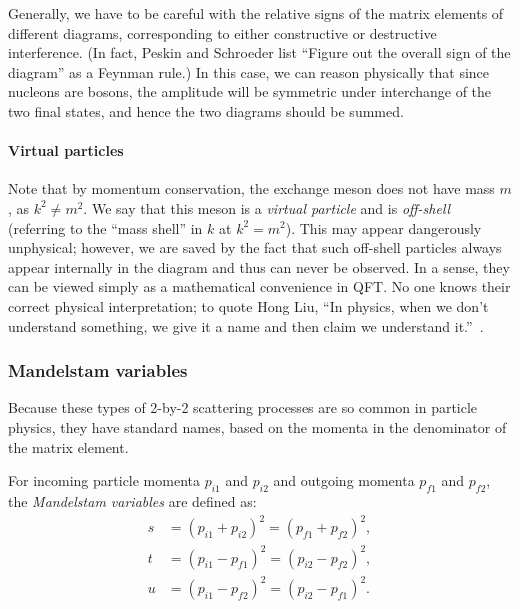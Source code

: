 Generally, we have to be careful with the relative signs of the matrix elements of different diagrams, corresponding to either constructive or destructive interference.
(In fact, Peskin and Schroeder list ``Figure out the overall sign of the diagram'' as a Feynman rule.)
In this case, we can reason physically that since nucleons are bosons, the amplitude will be symmetric under interchange of the two final states, and hence the two diagrams should be summed.

\paragraph{Virtual particles}

Note that by momentum conservation, the exchange meson does not have mass $m$, as $k^2 \neq m^2$.
We say that this meson is a \textit{virtual particle} and is \textit{off-shell} (referring to the ``mass shell'' in $k$ at $k^2 = m^2$).
This may appear dangerously unphysical; however, we are saved by the fact that such off-shell particles always appear internally in the diagram and thus can never be observed.
In a sense, they can be viewed simply as a mathematical convenience in QFT.
No one knows their correct physical interpretation; to quote Hong Liu, ``In physics, when we don't understand something, we give it a name and then claim we understand it.''~\cite{LiuRQFT}.


\subsubsection{Mandelstam variables}

Because these types of 2-by-2 scattering processes are so common in particle physics, they have standard names, based on the momenta in the denominator of the matrix element.

\begin{definition}
	For incoming particle momenta $p_{i1}$ and $p_{i2}$ and outgoing momenta $p_{f1}$ and $p_{f2}$, the \textit{Mandelstam variables} are defined as:
	\begin{equation}
		\label{eq:01_qft_interactions_mandelstam}
		\begin{split}
			s &= (p_{i1} + p_{i2})^2 = (p_{f1} + p_{f2})^2, \\
			t &= (p_{i1} - p_{f1})^2 = (p_{i2} - p_{f2})^2, \\
			u &= (p_{i1} - p_{f2})^2 = (p_{i2} - p_{f1})^2.
		\end{split}
	\end{equation}
\end{definition}

